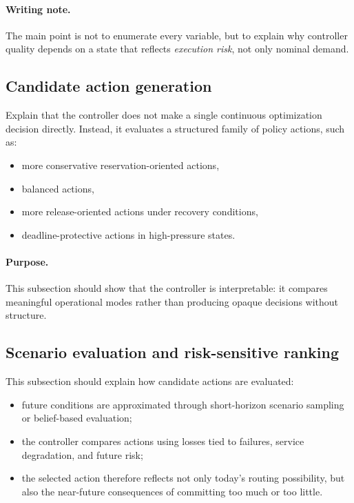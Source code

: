 \paragraph{Writing note.}
The main point is not to enumerate every variable, but to explain why controller quality depends on a state that reflects \emph{execution risk}, not only nominal demand.

\subsection{Candidate action generation}
\label{subsec:arch_candidate_actions}

Explain that the controller does not make a single continuous optimization decision directly. Instead, it evaluates a structured family of policy actions, such as:
\begin{itemize}
    \item more conservative reservation-oriented actions,
    \item balanced actions,
    \item more release-oriented actions under recovery conditions,
    \item deadline-protective actions in high-pressure states.
\end{itemize}

\paragraph{Purpose.}
This subsection should show that the controller is interpretable: it compares meaningful operational modes rather than producing opaque decisions without structure.

\subsection{Scenario evaluation and risk-sensitive ranking}
\label{subsec:arch_scenario_evaluation}

This subsection should explain how candidate actions are evaluated:
\begin{itemize}
    \item future conditions are approximated through short-horizon scenario sampling or belief-based evaluation;
    \item the controller compares actions using losses tied to failures, service degradation, and future risk;
    \item the selected action therefore reflects not only today's routing possibility, but also the near-future consequences of committing too much or too little.
\end{itemize}

